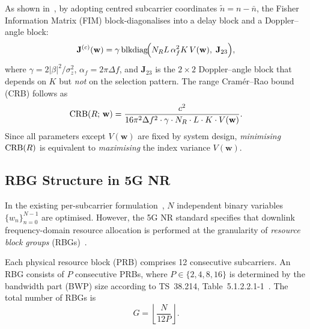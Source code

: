 As shown in~\cite{ldsa}, by adopting centred subcarrier coordinates $\tilde{n} = n - \bar{n}$, the Fisher Information Matrix (FIM) block-diagonalises into a delay block and a Doppler--angle block:
\begin{equation}
  \mathbf{J}^{(c)}(\mathbf{w}) = \gamma \, \mathrm{blkdiag}\!\Big(
    N_R L \, \alpha_f^2 K \, V(\mathbf{w}),\;
    \mathbf{J}_{23}
  \Big),
  \label{eq:fim_block}
\end{equation}
where $\gamma = 2|\beta|^2 / \sigma_z^2$, $\alpha_f = 2\pi \Delta f$, and $\mathbf{J}_{23}$ is the $2\times 2$ Doppler--angle block that depends on $K$ but \emph{not} on the selection pattern.
The range Cram\'{e}r--Rao bound (CRB) follows as
\begin{equation}
  \mathrm{CRB}(R;\, \mathbf{w}) = \frac{c^2}{16\pi^2 \Delta f^2 \cdot \gamma \cdot N_R \cdot L \cdot K \cdot V(\mathbf{w})}.
  \label{eq:crb_range}
\end{equation}
Since all parameters except $V(\mathbf{w})$ are fixed by system design, \emph{minimising} $\mathrm{CRB}(R)$ is equivalent to \emph{maximising} the index variance $V(\mathbf{w})$.

\subsection{RBG Structure in 5G NR}
\label{subsec:rbg_structure}

In the existing per-subcarrier formulation~\cite{ldsa}, $N$ independent binary variables $\{w_n\}_{n=0}^{N-1}$ are optimised.
However, the 5G NR standard specifies that downlink frequency-domain resource allocation is performed at the granularity of \emph{resource block groups} (RBGs)~\cite{3gpp.38.214}.

\begin{definition}
\label{def:rbg}
Each physical resource block (PRB) comprises 12 consecutive subcarriers.
An RBG consists of $P$ consecutive PRBs, where $P \in \{2, 4, 8, 16\}$ is determined by the bandwidth part (BWP) size according to TS~38.214, Table~5.1.2.2.1-1~\cite{3gpp.38.214}.
The total number of RBGs is
\begin{equation}
  G = \left\lfloor \frac{N}{12P} \right\rfloor.
  \label{eq:num_rbg}
\end{equation}
\end{definition}

